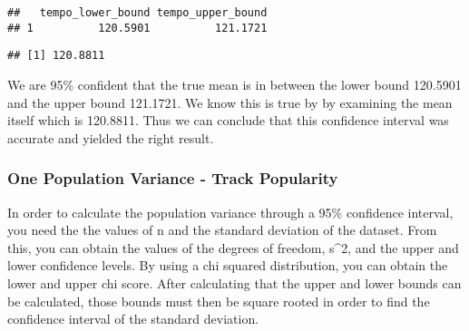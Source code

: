 \documentclass[
]{article}
\newenvironment{Shaded}{\begin{snugshade}}{\end{snugshade}}
\newcommand{\KeywordTok}[1]{\textcolor[rgb]{0.13,0.29,0.53}{\textbf{#1}}}
\newcommand{\NormalTok}[1]{#1}
\newcommand{\OperatorTok}[1]{\textcolor[rgb]{0.81,0.36,0.00}{\textbf{#1}}}
\newcommand{\StringTok}[1]{\textcolor[rgb]{0.31,0.60,0.02}{#1}}
\begin{document}
\begin{verbatim}
##   tempo_lower_bound tempo_upper_bound
## 1          120.5901          121.1721
\end{verbatim}

\begin{Shaded}
\end{Shaded}

\begin{verbatim}
## [1] 120.8811
\end{verbatim}

We are 95\% confident that the true mean is in between the lower bound
120.5901 and the upper bound 121.1721. We know this is true by by
examining the mean itself which is 120.8811. Thus we can conclude that
this confidence interval was accurate and yielded the right result.

\hypertarget{one-population-variance---track-popularity}{%
\subsubsection{One Population Variance - Track
Popularity}\label{one-population-variance---track-popularity}}

In order to calculate the population variance through a 95\% confidence
interval, you need the the values of n and the standard deviation of the
dataset. From this, you can obtain the values of the degrees of freedom,
s\^{}2, and the upper and lower confidence levels. By using a chi
squared distribution, you can obtain the lower and upper chi score.
After calculating that the upper and lower bounds can be calculated,
those bounds must then be square rooted in order to find the confidence
interval of the standard deviation.
\end{document}
